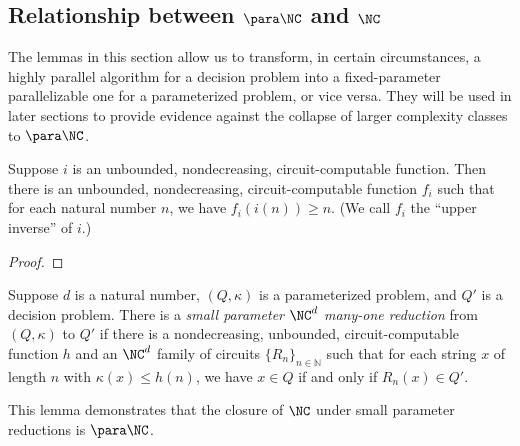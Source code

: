 \subsection{Relationship between \texorpdfstring{$\para \NC$}{paraNC} and \texorpdfstring{$\NC$}{NC}}

The lemmas in this section allow us to transform, in certain circumstances, a highly parallel algorithm for a decision problem into a fixed-parameter parallelizable one for a parameterized problem, or vice versa.
They will be used in later sections to provide evidence against the collapse of larger complexity classes to $\para \NC$.

\begin{lemma}\label{lem:upperinverse}
  Suppose $i$ is an unbounded, nondecreasing, circuit-computable function.
  Then there is an unbounded, nondecreasing, circuit-computable function $f_i$ such that for each natural number $n$, we have $f_i(i(n)) \geq n$.
  (We call $f_i$ the ``upper inverse'' of $i$.)
\end{lemma}
\begin{proof}
\end{proof}

\begin{definition}\label{def:spreduction}
  Suppose $d$ is a natural number, $(Q, \kappa)$ is a parameterized problem, and $Q'$ is a decision problem.
  There is a \emph{small parameter $\NC^d$ many-one reduction} from $(Q, \kappa)$ to $Q'$ if there is a nondecreasing, unbounded, circuit-computable function $h$ and an $\NC^d$ family of circuits $\{R_n\}_{n \in \mathbb{N}}$ such that for each string $x$ of length $n$ with $\kappa(x) \leq h(n)$, we have $x \in Q$ if and only if $R_n(x) \in Q'$.
\end{definition}

This lemma demonstrates that the closure of $\NC$ under small parameter reductions is $\para \NC$.

